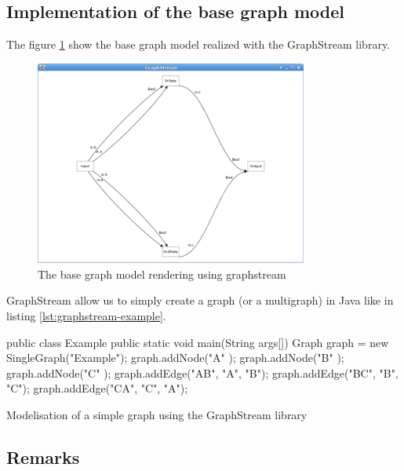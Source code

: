 \subsection{Implementation of the base graph model} %
\label{sub:Implementation}

The figure \ref{fig:base-graph-model-graphstream} show the base graph model realized with the GraphStream library.

\begin{figure}[h]
    \centering
    \includegraphics[width=0.8\textwidth]{img/graphstream-base-model-example}
    \caption{The base graph model rendering using graphstream}
    \label{fig:base-graph-model-graphstream}
\end{figure}

GraphStream allow us to simply create a graph (or a multigraph) in Java like in listing \ref{lst:graphstream-example}.

\begin{listing}[p]
 \centering
 \begin{javacode}
 public class Example
 {
    public static void main(String args[])
    {
        Graph graph = new SingleGraph("Example");
        graph.addNode("A" );
        graph.addNode("B" );
        graph.addNode("C" );
        graph.addEdge("AB", "A", "B");
        graph.addEdge("BC", "B", "C");
        graph.addEdge("CA", "C", "A");
    }
 }
 \end{javacode}
 \caption[A simple graph modelisation using GraphStream]{Modelisation of a simple graph using the GraphStream library}
 \label{lst:graphstream-example}
\end{listing}


\subsection{Remarks} %
\label{sub:Remarks}

